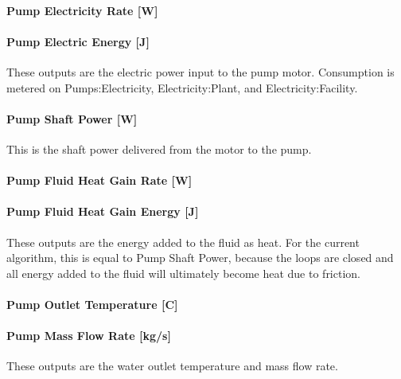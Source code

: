\paragraph{Pump Electricity Rate {[}W{]}}\label{pump-electric-power-w-1}

\paragraph{Pump Electric Energy {[}J{]}}\label{pump-electric-energy-j-1}

These outputs are the electric power input to the pump motor. Consumption is metered on Pumps:Electricity, Electricity:Plant, and Electricity:Facility.

\paragraph{Pump Shaft Power {[}W{]}}\label{pump-shaft-power-w-1}

This is the shaft power delivered from the motor to the pump.

\paragraph{Pump Fluid Heat Gain Rate {[}W{]}}\label{pump-fluid-heat-gain-rate-w-1}

\paragraph{Pump Fluid Heat Gain Energy {[}J{]}}\label{pump-fluid-heat-gain-energy-j-1}

These outputs are the energy added to the fluid as heat. For the current algorithm, this is equal to Pump Shaft Power, because the loops are closed and all energy added to the fluid will ultimately become heat due to friction.

\paragraph{Pump Outlet Temperature {[}C{]}}\label{pump-outlet-temperature-c-1}

\paragraph{Pump Mass Flow Rate {[}kg/s{]}}\label{pump-mass-flow-rate-kgs-1}

These outputs are the water outlet temperature and mass flow rate.

